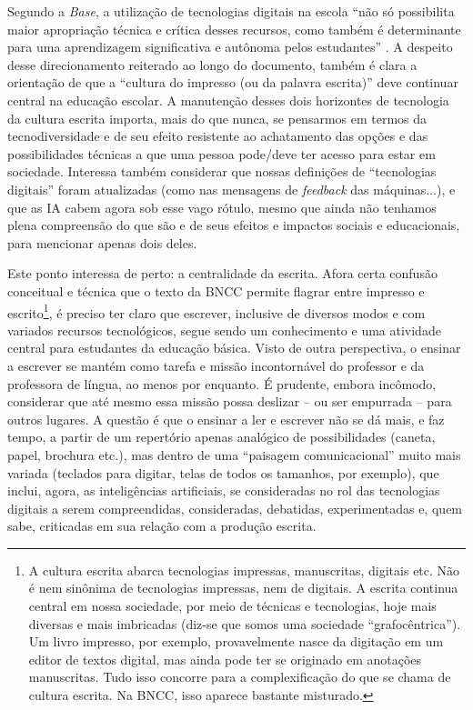 \documentclass[portuguese]{textolivre}
\begin{document}
Segundo a \textit{Base}, a utilização de tecnologias digitais na escola ``não só possibilita maior apropriação técnica e crítica desses recursos, como também é determinante para uma aprendizagem significativa e autônoma pelos estudantes'' \cite[p. 478]{brasil2018}. A despeito desse direcionamento reiterado ao longo do documento, também é clara a orientação de que a ``cultura do impresso (ou da palavra escrita)'' \cite[p. 478]{brasil2018} deve continuar central na educação escolar. A manutenção desses dois horizontes de tecnologia da cultura escrita importa, mais do que nunca, se pensarmos em termos da tecnodiversidade \cite{hui2020} e de seu efeito resistente ao achatamento das opções e das possibilidades técnicas a que uma pessoa pode/deve ter acesso para estar em sociedade. Interessa também considerar que nossas definições de ``tecnologias digitais'' foram atualizadas (como nas mensagens de \textit{feedback} das máquinas...), e que as IA cabem agora sob esse vago rótulo, mesmo que ainda não tenhamos plena compreensão do que são e de seus efeitos e impactos sociais e educacionais, para mencionar apenas dois deles.

Este ponto interessa de perto: a centralidade da escrita. Afora certa confusão conceitual e técnica que o texto da BNCC permite flagrar entre impresso e escrito\footnote{ A cultura escrita abarca tecnologias impressas, manuscritas, digitais etc. Não é nem sinônima de tecnologias impressas, nem de digitais. A escrita continua central em nossa sociedade, por meio de técnicas e tecnologias, hoje mais diversas e mais imbricadas (diz-se que somos uma sociedade ``grafocêntrica''). Um livro impresso, por exemplo, provavelmente nasce da digitação em um editor de textos digital, mas ainda pode ter se originado em anotações manuscritas. Tudo isso concorre para a complexificação do que se chama de cultura escrita. Na BNCC, isso aparece bastante misturado.}, é preciso ter claro que escrever, inclusive de diversos modos e com variados recursos tecnológicos, segue sendo um conhecimento e uma atividade central para estudantes da educação básica. Visto de outra perspectiva, o ensinar a escrever se mantém como tarefa e missão incontornável do professor e da professora de língua, ao menos por enquanto. É prudente, embora incômodo, considerar que até mesmo essa missão possa deslizar – ou ser empurrada – para outros lugares. A questão é que o ensinar a ler e escrever não se dá mais, e faz tempo, a partir de um repertório apenas analógico de possibilidades (caneta, papel, brochura etc.), mas dentro de uma ``paisagem comunicacional'' \cite{kress2003} muito mais variada (teclados para digitar, telas de todos os tamanhos, por exemplo), que inclui, agora, as inteligências artificiais, se consideradas no rol das tecnologias digitais a serem compreendidas, consideradas, debatidas, experimentadas e, quem sabe, criticadas em sua relação com a produção escrita.
\end{document}
